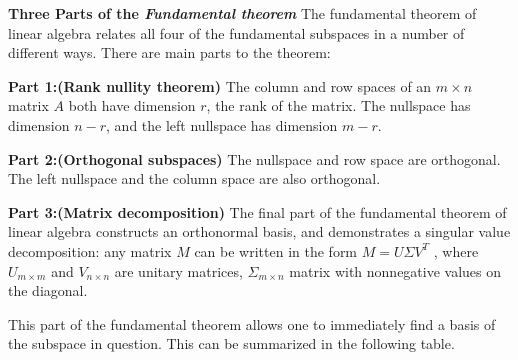 \documentclass[
  letterpaper,
  DIV=11,
  numbers=noendperiod]{scrreprt}
\theoremstyle{plain}
\theoremstyle{definition}
\theoremstyle{remark}
\begin{document}
\begin{tcolorbox}[enhanced jigsaw, leftrule=.75mm, bottomtitle=1mm, colback=white, toptitle=1mm, opacitybacktitle=0.6, toprule=.15mm, colbacktitle=quarto-callout-important-color!10!white, arc=.35mm, colframe=quarto-callout-important-color-frame, title=\textcolor{quarto-callout-important-color}{\faExclamation}\hspace{0.5em}{Important}, titlerule=0mm, rightrule=.15mm, left=2mm, bottomrule=.15mm, breakable, coltitle=black, opacityback=0]

\textbf{Three Parts of the \emph{Fundamental theorem}} The fundamental
theorem of linear algebra relates all four of the fundamental subspaces
in a number of different ways. There are main parts to the theorem:

\textbf{Part 1:(Rank nullity theorem)} The column and row spaces of an
\(m\times n\) matrix \(A\) both have dimension \(r\), the rank of the
matrix. The nullspace has dimension \(n−r\), and the left nullspace has
dimension \(m−r\).

\textbf{Part 2:(Orthogonal subspaces)} The nullspace and row space are
orthogonal. The left nullspace and the column space are also orthogonal.

\textbf{Part 3:(Matrix decomposition)} The final part of the fundamental
theorem of linear algebra constructs an orthonormal basis, and
demonstrates a singular value decomposition: any matrix \(M\) can be
written in the form \(M=U\Sigma V^T\) , where \(U_{m\times m}\) and
\(V_{n\times n}\) are unitary matrices, \(\Sigma_{m\times n}\) matrix
with nonnegative values on the diagonal.

This part of the fundamental theorem allows one to immediately find a
basis of the subspace in question. This can be summarized in the
following table.


\end{tcolorbox}
\end{document}

